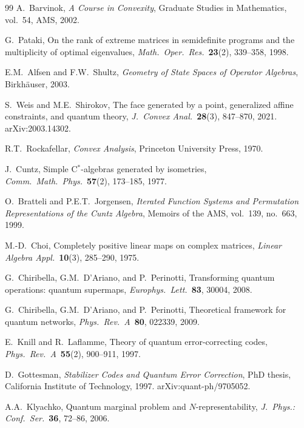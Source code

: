 \documentclass[11pt,a4paper]{article}
\theoremstyle{definition}
\begin{document}
\begin{thebibliography}{99}
  A.~Barvinok,
  \emph{A Course in Convexity},
  Graduate Studies in Mathematics, vol.~54, AMS, 2002.

  G.~Pataki,
  On the rank of extreme matrices in semidefinite programs and the
  multiplicity of optimal eigenvalues,
  \emph{Math.\ Oper.\ Res.}\ \textbf{23}(2), 339--358, 1998.

  E.M.~Alfsen and F.W.~Shultz,
  \emph{Geometry of State Spaces of Operator Algebras},
  Birkh\"auser, 2003.

  S.~Weis and M.E.~Shirokov,
  The face generated by a point, generalized affine constraints, and
  quantum theory,
  \emph{J.\ Convex Anal.}\ \textbf{28}(3), 847--870, 2021.
  arXiv:2003.14302.

  R.T.~Rockafellar,
  \emph{Convex Analysis},
  Princeton University Press, 1970.

  J.~Cuntz,
  Simple C$^*$-algebras generated by isometries,
  \emph{Comm.\ Math.\ Phys.}\ \textbf{57}(2), 173--185, 1977.

  O.~Bratteli and P.E.T.~Jorgensen,
  \emph{Iterated Function Systems and Permutation Representations
  of the Cuntz Algebra},
  Memoirs of the AMS, vol.~139, no.~663, 1999.

  M.-D.~Choi,
  Completely positive linear maps on complex matrices,
  \emph{Linear Algebra Appl.}\ \textbf{10}(3), 285--290, 1975.

  G.~Chiribella, G.M.~D'Ariano, and P.~Perinotti,
  Transforming quantum operations: quantum supermaps,
  \emph{Europhys.\ Lett.}\ \textbf{83}, 30004, 2008.

  G.~Chiribella, G.M.~D'Ariano, and P.~Perinotti,
  Theoretical framework for quantum networks,
  \emph{Phys.\ Rev.\ A}\ \textbf{80}, 022339, 2009.

  E.~Knill and R.~Laflamme,
  Theory of quantum error-correcting codes,
  \emph{Phys.\ Rev.\ A}\ \textbf{55}(2), 900--911, 1997.

  D.~Gottesman,
  \emph{Stabilizer Codes and Quantum Error Correction},
  PhD thesis, California Institute of Technology, 1997.
  arXiv:quant-ph/9705052.

  A.A.~Klyachko,
  Quantum marginal problem and $N$-representability,
  \emph{J.\ Phys.: Conf.\ Ser.}\ \textbf{36}, 72--86, 2006.


\end{thebibliography}
\end{document}
